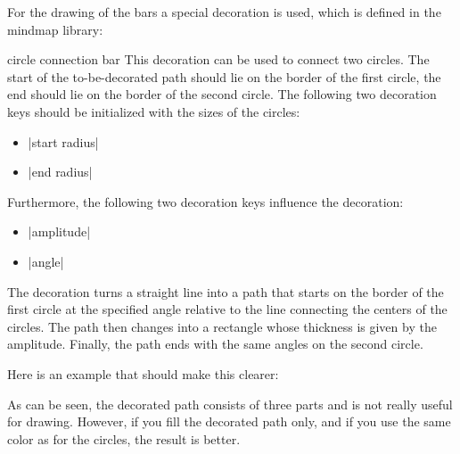 For the drawing of the bars a special decoration is used, which is defined
in the mindmap library:

\begin{decoration}{circle connection bar}
  This decoration can be used to connect two circles. The start of the
  to-be-decorated path should lie on the border of the first circle,
  the end should lie on the border of the second circle. The following
  two decoration keys should be initialized with the sizes of the circles:
  \begin{itemize}
  \item |start radius|
  \item |end radius|
  \end{itemize}
  Furthermore, the following two decoration keys influence the decoration:
  \begin{itemize}
  \item |amplitude|
  \item |angle|
  \end{itemize}
  The decoration turns a straight line into a path that starts on the border of the
  first circle at the specified angle relative to the line connecting
  the centers of the circles. The path then changes into a rectangle
  whose thickness is given by the amplitude. Finally, the path ends
  with the same angles on the second circle.

  Here is an example that should make this clearer:
\begin{codeexample}[]
\end{codeexample}

  As can be seen, the decorated path consists of three parts and is not really
  useful for drawing. However, if you fill the decorated path only, and if you
  use the same color as for the circles, the result is better.
\begin{codeexample}[]
\end{codeexample}
\end{decoration}
